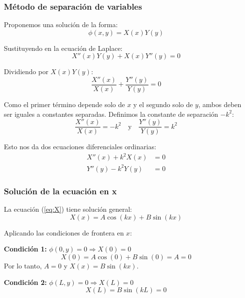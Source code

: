 \documentclass[a4paper]{article}
\begin{document}
\subsubsection{Método de separación de variables}

Proponemos una solución de la forma:
\begin{equation}
\phi(x, y) = X(x)Y(y)
\end{equation}

Sustituyendo en la ecuación de Laplace:
\begin{equation}
X''(x)Y(y) + X(x)Y''(y) = 0
\end{equation}

Dividiendo por $X(x)Y(y)$:
\begin{equation}
\frac{X''(x)}{X(x)} + \frac{Y''(y)}{Y(y)} = 0
\end{equation}

Como el primer término depende solo de $x$ y el segundo solo de $y$, ambos deben ser iguales a constantes separadas. Definimos la constante de separación $-k^2$:
\begin{equation}
\frac{X''(x)}{X(x)} = -k^2 \quad \text{y} \quad \frac{Y''(y)}{Y(y)} = k^2
\end{equation}

Esto nos da dos ecuaciones diferenciales ordinarias:
\begin{align}
X''(x) + k^2 X(x) &= 0 \label{eq:X} \\
Y''(y) - k^2 Y(y) &= 0 \label{eq:Y}
\end{align}

\subsubsection{Solución de la ecuación en x}

La ecuación (\ref{eq:X}) tiene solución general:
\begin{equation}
X(x) = A \cos(kx) + B \sin(kx)
\end{equation}

Aplicando las condiciones de frontera en $x$:

\textbf{Condición 1:} $\phi(0, y) = 0 \Rightarrow X(0) = 0$
\begin{equation}
X(0) = A \cos(0) + B \sin(0) = A = 0
\end{equation}
Por lo tanto, $A = 0$ y $X(x) = B \sin(kx)$.

\textbf{Condición 2:} $\phi(L, y) = 0 \Rightarrow X(L) = 0$
\begin{equation}
X(L) = B \sin(kL) = 0
\end{equation}
\end{document}
